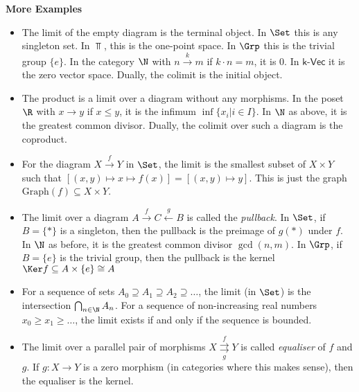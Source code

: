\textbf{More Examples}
\begin{itemize}
  \item The limit of the empty diagram is the terminal object. In $\Set$ this is any singleton set. In $\Top$, this is the one-point space. In $\Grp$ this is the trivial group $\{e\}$. In the category $\N$ with $n \stackrel{k}{\to} m$ if $k \cdot n = m$, it is $0$. In $\textsf{k-Vec}$ it is the zero vector space.
    Dually, the colimit is the initial object.
    \item The product is a limit over a diagram without any morphisms. In the poset $\R$ with $x \to y$ if $x \leq y$, it is the infimum $\inf\{x_i \big\vert i \in I\}$. In $\N$ as above, it is the greatest common divisor. 
    Dually, the colimit over such a diagram is the coproduct.
    \item For the diagram $X \stackrel{f}{\to} Y$ in $\Set$, the limit is the smallest subset of $X \times Y$ such that $[(x,y) \mapsto x \mapsto f(x)] = [(x,y) \mapsto y]$. 
    This is just the graph $\text{Graph}(f) \subseteq X \times Y$.
    \item The limit over a diagram $A \stackrel{f}{\longrightarrow} C \stackrel{g}{\longleftarrow}B$ is called the \emph{pullback}.
    In $\Set$, if $B = \{\ast\}$ is a singleton, then the pullback is the preimage of $g(\ast)$ under $f$. In $\N$ as before, it is the greatest common divisor $\gcd(n,m)$. In $\Grp$, if $B = \{e\}$ is the trivial group, then the pullback is the kernel $\Ker f \subseteq A \times \{e\} \cong A$
    \item For a sequence of sets $A_0 \supseteq A_1 \supseteq A_2 \supseteq \ldots$, the limit (in $\Set$) is the intersection $\bigcap_{n \in \N}A_n$.  For a sequence of non-increasing real numbers $x_0 \geq x_1 \geq \ldots$, the limit exists if and only if the sequence is bounded.
    \item The limit over a parallel pair of morphisms $X \overset{f}{\underset{g}{\rightrightarrows}} Y$ is called \emph{equaliser} of $f$ and $g$. 
    If $g:X \to Y$ is a zero morphism (in categories where this makes sense), then the equaliser is the kernel. 
\end{itemize} 
    

